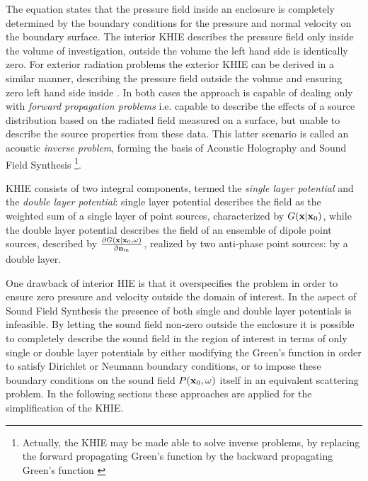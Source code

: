 The equation states that the pressure field inside an enclosure is completely determined by the boundary conditions for the pressure and normal velocity on the boundary surface.
The interior KHIE describes the pressure field only inside the volume of investigation, outside the volume the left hand side is identically zero. For exterior radiation problems the exterior KHIE can be derived in a similar manner, describing the pressure field outside the volume and ensuring zero left hand side inside \cite{Williams1999}.
In both cases the approach is capable of dealing only with \emph{forward propagation problems} i.e. capable to describe the effects of a source distribution based on the radiated field measured on a surface, but unable to describe the source properties from these data. 
This latter scenario is called an acoustic \emph{inverse problem}, forming the basis of Acoustic Holography and Sound Field Synthesis 
\footnote{Actually, the KHIE may be made able to solve inverse problems, by replacing the forward propagating Green's function by the backward propagating Green's function \cite{Wapenaar1989}}.
\vspace{3mm}

KHIE consists of two integral components, termed the \emph{single layer potential} and the \emph{double layer potential}: single layer potential describes the field as the weighted sum of a single layer of point sources, characterized by $ G(\mathbf{x}|\mathbf{x}_0) $, while the double layer potential describes the field of an ensemble of dipole point sources, described by $\frac{\partial G(\mathbf{x}|\mathbf{x}_0,\omega)}{\partial \mathbf{n}_{\mathrm{in}}}$, realized by two anti-phase point sources: by a double layer.

One drawback of interior HIE is that it overspecifies the problem in order to ensure zero pressure and velocity outside the domain of interest. 
In the aspect of Sound Field Synthesis the presence of both single and double layer potentials is infeasible.
By letting the sound field non-zero outside the enclosure it is possible to completely describe the sound field in the region of interest in terms of only single or double layer potentials by either modifying the Green's function in order to satisfy Dirichlet or Neumann boundary conditions, or to impose these boundary conditions on the sound field $ P(\mathbf{x}_0,\omega)$ itself in an equivalent scattering problem.
In the following sections these approaches are applied for the simplification of the KHIE.



